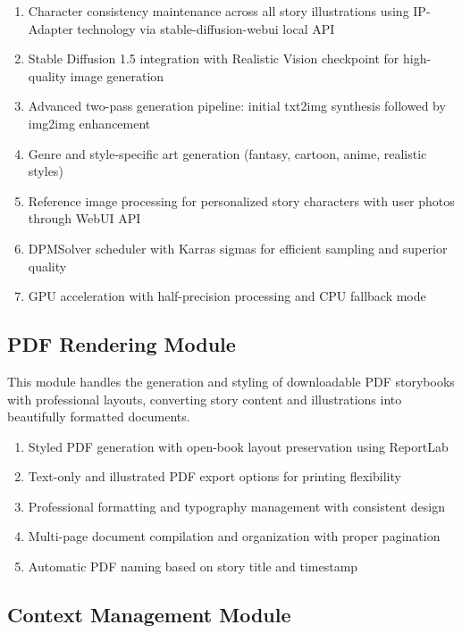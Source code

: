 \begin{enumerate}
    \item Character consistency maintenance across all story illustrations using IP-Adapter technology via stable-diffusion-webui local API
    \item Stable Diffusion 1.5 integration with Realistic Vision checkpoint for high-quality image generation
    \item Advanced two-pass generation pipeline: initial txt2img synthesis followed by img2img enhancement
    \item Genre and style-specific art generation (fantasy, cartoon, anime, realistic styles)
    \item Reference image processing for personalized story characters with user photos through WebUI API
    \item DPMSolver scheduler with Karras sigmas for efficient sampling and superior quality
    \item GPU acceleration with half-precision processing and CPU fallback mode
\end{enumerate}

\subsection{PDF Rendering Module}

This module handles the generation and styling of downloadable PDF storybooks with professional layouts, converting story content and illustrations into beautifully formatted documents.

\begin{enumerate}
    \item Styled PDF generation with open-book layout preservation using ReportLab
    \item Text-only and illustrated PDF export options for printing flexibility
    \item Professional formatting and typography management with consistent design
    \item Multi-page document compilation and organization with proper pagination
    \item Automatic PDF naming based on story title and timestamp
\end{enumerate}

\subsection{Context Management Module}

